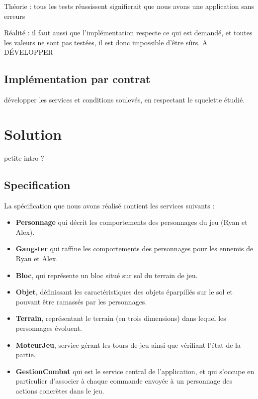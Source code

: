 \documentclass[a4paper, 11pt, notitlepage]{article}
\begin{document}
Théorie : tous les tests réussissent signifierait que nous avons une application sans erreurs

Réalité : il faut aussi que l’implémentation respecte ce qui est
demandé, et toutes les valeurs ne sont pas testées, il est donc
impossible d'être sûrs. A DÉVELOPPER 


\subsection{Implémentation par contrat}
développer les services et conditions soulevés, en respectant le
squelette étudié.








\section{Solution}
petite intro ?

\subsection{Specification}

La spécification que nous avons réalisé contient les services suivants : 

\begin{itemize}
\item \textbf{Personnage} qui décrit les comportements des personnages du jeu (Ryan et Alex).
\item \textbf{Gangster} qui raffine les comportements des personnages pour les ennemis de Ryan et Alex.
\item \textbf{Bloc}, qui représente un bloc situé sur sol du terrain de jeu.
\item \textbf{Objet}, définissant les caractéristiques des objets éparpillés sur le sol et pouvant être ramassés par les personnages.
\item \textbf{Terrain}, représentant le terrain (en trois dimensions) dans lequel les personnages évoluent.
\item \textbf{MoteurJeu}, service gérant les tours de jeu ainsi que vérifiant l'état de la partie.
\item \textbf{GestionCombat} qui est le service central de l'application, et qui s'occupe en particulier d'associer à chaque commande envoyée à un personnage des actions concrètes dans le jeu. \\
\end{itemize}
\end{document}
